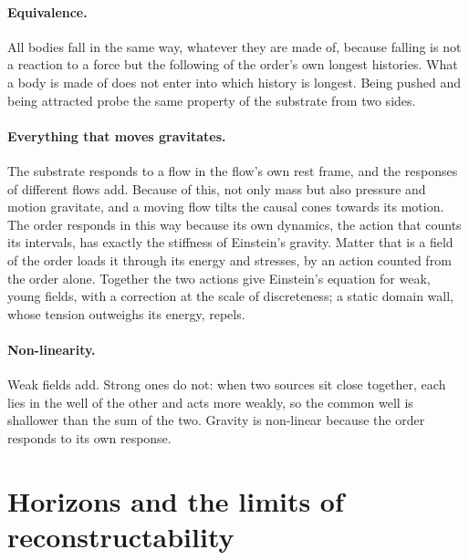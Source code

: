 \paragraph{Equivalence.} All bodies fall in the same way, whatever they are made of, because falling is
not a reaction to a force but the following of the order's own longest histories. What a body is made
of does not enter into which history is longest. Being pushed and being attracted probe the same
property of the substrate from two sides. 

\paragraph{Everything that moves gravitates.} The substrate responds to a flow in the flow's own rest
frame, and the responses of different flows add. Because of this, not only mass but also pressure
and motion gravitate, and a moving flow tilts the causal cones towards its motion.
\quad The order responds in this way because its own dynamics, the action that
counts its intervals, has exactly the stiffness of Einstein's gravity.
\quad Matter that is a field of the order loads it through its energy and stresses, by an action counted
from the order alone. \quad Together the two actions give Einstein's equation for
weak, young fields, with a correction at the scale of discreteness; a static domain wall, whose tension outweighs
its energy, repels. 

\paragraph{Non-linearity.} Weak fields add. Strong ones do not: when two sources sit close together,
each lies in the well of the other and acts more weakly, so the common well is shallower than the sum
of the two. Gravity is non-linear because the order responds to its own response.

\section{Horizons and the limits of reconstructability}\label{sec:onto-horizons}

